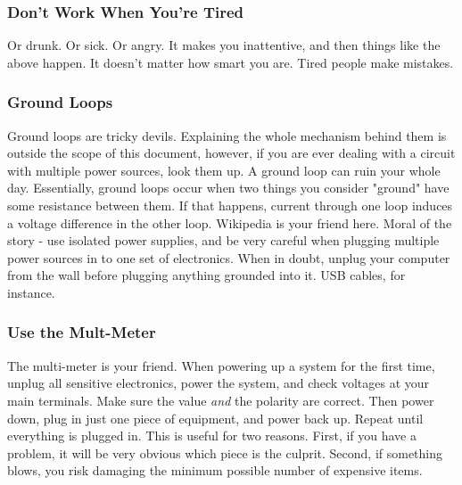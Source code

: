 \subsubsection{Don't Work When You're Tired}

Or drunk. Or sick. Or angry. It makes you inattentive, and then things like the above happen. It doesn't matter how smart you are. Tired people make mistakes.

\subsubsection{Ground Loops}

Ground loops are tricky devils. Explaining the whole mechanism behind them is outside the scope of this document, however, if you are ever dealing with a circuit with multiple power sources, look them up. A ground loop can ruin your whole day. Essentially, ground loops occur when two things you consider "ground" have some resistance between them. If that happens, current through one loop induces a voltage difference in the other loop. Wikipedia is your friend here. Moral of the story - use isolated power supplies, and be very careful when plugging multiple power sources in to one set of electronics. When in doubt, unplug your computer from the wall before plugging anything grounded into it. USB cables, for instance.

\subsubsection{Use the Mult-Meter}

The multi-meter is your friend. When powering up a system for the first time, unplug all sensitive electronics, power the system, and check voltages at your main terminals. Make sure the value \textit{and} the polarity are correct. Then power down, plug in just one piece of equipment, and power back up. Repeat until everything is plugged in. This is useful for two reasons. First, if you have a problem, it will be very obvious which piece is the culprit. Second, if something blows, you risk damaging the minimum possible number of expensive items.

